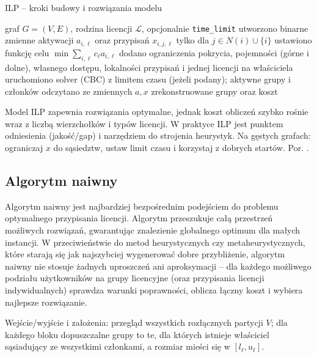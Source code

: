 \begin{algorithm}[H]
\caption{ILP – kroki budowy i rozwiązania modelu}
\label{alg:ilp}
\begin{algorithmic}[1]
\Require graf $G=(V,E)$, rodzina licencji $\mathcal{L}$, opcjonalnie \texttt{time\_limit}
\State utworzono binarne zmienne aktywacji $a_{i,\ell}$ oraz przypisań $x_{i,j,\ell}$ tylko dla $j\in N(i)\cup\{i\}$
\State ustawiono funkcję celu \(\min\sum_{i,\ell} c_\ell a_{i,\ell}\)
\State dodano ograniczenia pokrycia, pojemności (górne i dolne), własnego dostępu, lokalności przypisań i jednej licencji na właściciela
\State uruchomiono solver (CBC) z limitem czasu (jeżeli podany); aktywne grupy i członków odczytano ze zmiennych \(a,x\)
\State \Return zrekonstruowane grupy oraz koszt
\end{algorithmic}
\end{algorithm}

\begin{practical}
Model ILP zapewnia rozwiązania optymalne, jednak koszt obliczeń szybko rośnie wraz z liczbą wierzchołków i typów licencji. W praktyce ILP jest punktem odniesienia (jakość/gap) i narzędziem do strojenia heurystyk. Na gęstych grafach: ograniczaj $x$ do sąsiedztw, ustaw limit czasu i korzystaj z dobrych startów. Por. \cite{wolsey1998}.
\end{practical}




\subsection{Algorytm naiwny}

Algorytm naiwny jest najbardziej bezpośrednim podejściem do problemu optymalnego przypisania licencji. Algorytm przeszukuje całą przestrzeń możliwych rozwiązań, gwarantując znalezienie globalnego optimum dla małych instancji. W przeciwieństwie do metod heurystycznych czy metaheurystycznych, które starają się jak najszybciej wygenerować dobre przybliżenie, algorytm naiwny nie stosuje żadnych uproszczeń ani aproksymacji – dla każdego możliwego podziału użytkowników na grupy licencyjne (oraz przypisania licencji indywidualnych) sprawdza warunki poprawności, oblicza łączny koszt i wybiera najlepsze rozwiązanie.

Wejście/wyjście i założenia: przegląd wszystkich rozłącznych partycji $V$; dla każdego bloku dopuszczalne grupy to te, dla których istnieje właściciel sąsiadujący ze wszystkimi członkami, a rozmiar mieści się w $[l_\ell,u_\ell]$.

